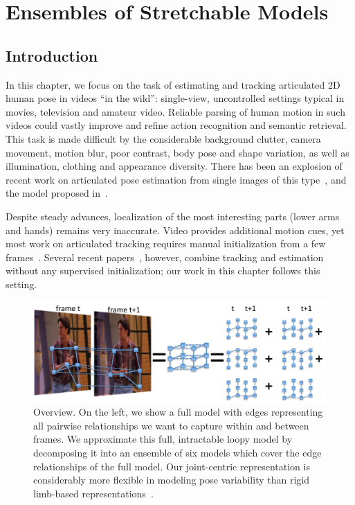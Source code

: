 \chapter{Ensembles of Stretchable Models} \label{sec:stretchable}
\section{Introduction}


In this chapter, we focus on the task of estimating and tracking articulated 2D 
human pose in videos ``in the wild'': single-view, uncontrolled settings 
typical in movies, television and amateur video.   Reliable
parsing of human motion in such videos could vastly improve and refine action 
recognition and semantic retrieval. This task is made difficult by the 
considerable background clutter, camera movement, motion blur, poor contrast, 
body pose and shape variation, as well as illumination, clothing and appearance 
diversity. There has been an explosion of recent work on articulated pose 
estimation from single images of this type~\citep{ronfard02, 
miko04,felz05,devaparse,ferrari08,eichner09, andriluka09}, and the model 
proposed in~.  

Despite steady advances, localization of the most interesting parts (lower arms 
and hands) remains very inaccurate.  Video provides additional motion cues, yet 
most work on articulated tracking requires manual initialization from a few
frames~\citep{cardboard,bregler98,balan06,sminchisescu03,ren07,buehler08}.  
Several recent papers~\citep{sigal04, lan05,strikeapose,ferrari08,weisssapp10}, 
however, combine tracking and estimation without any supervised initialization; 
our work in this chapter follows this setting.

\begin{figure}[t!]
\centering
\includegraphics[width=0.99\linewidth]{figs/stretchable-overview.pdf}
\caption[Stretchable Ensembles overview]{\label{fig:overview} Overview.  On the 
left, we show a full model with edges representing all pairwise relationships 
we want to capture within and between frames.  We approximate this full, 
intractable loopy model by decomposing it into an ensemble of six models which 
cover the edge relationships of the full model.  Our joint-centric 
representation is considerably more flexible in modeling pose variability than 
rigid limb-based 
representations~\citep{ferrari08,sapp2010cascades,andriluka09}.}
\label{fig:stretchable-overview}
\end{figure}

